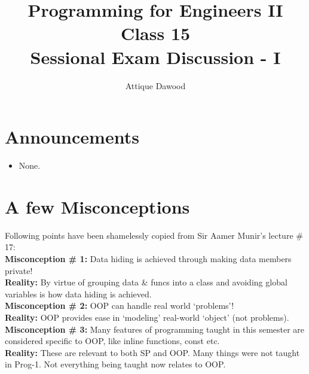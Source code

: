 \documentclass[12pt,a4paper]{article}
\title{\vspace{-2cm}Programming for Engineers II\\Class 15\\Sessional Exam Discussion - I}
\author{Attique Dawood}
\begin{document}
\maketitle
\section{Announcements}
\begin{itemize}
\item None.
\end{itemize}
\section{A few Misconceptions}
Following points have been shamelessly copied from Sir Aamer Munir's lecture \# 17:\\
\noindent\textbf{Misconception \# 1:} Data hiding is achieved through making data members private!\\
\noindent\textbf{Reality:} By virtue of grouping data \& funcs into a class and avoiding global variables is how data hiding is achieved.\\
\noindent\textbf{Misconception \# 2:} OOP can handle real world ‘problems’!\\
\noindent\textbf{Reality:} OOP provides ease in ‘modeling’ real-world ‘object’ (not problems).\\
\noindent\textbf{Misconception \# 3:} Many features of programming taught in this semester are considered specific to OOP, like inline functions, const etc.\\
\noindent\textbf{Reality:} These are relevant to both SP and OOP. Many things were not taught in Prog-1. Not everything being taught now relates to OOP.\\


\end{document}
